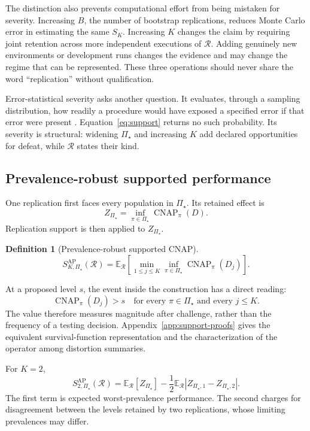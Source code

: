 \documentclass[11pt]{article}
\newcommand{\CNAP}{\operatorname{CNAP}}
\newcommand{\Regime}{\mathcal{R}}
\newcommand{\PSet}{\Pi_\star}
\newcommand{\E}{\mathbb{E}}
\newcommand{\SRob}{S_{K,\PSet}^{\mathrm{AP}}(\Regime)}
\newtheorem{definition}{Definition}
\theoremstyle{remark}
\begin{document}
The distinction also prevents computational effort from being mistaken for severity. Increasing $B$, the number of bootstrap replications, reduces Monte Carlo error in estimating the same $S_K$. Increasing $K$ changes the claim by requiring joint retention across more independent executions of $\Regime$. Adding genuinely new environments or development runs changes the evidence and may change the regime that can be represented. These three operations should never share the word ``replication'' without qualification.

Error-statistical severity asks another question. It evaluates, through a sampling distribution, how readily a procedure would have exposed a specified error if that error were present \cite{mayo1996error}. Equation~\eqref{eq:support} returns no such probability. Its severity is structural: widening $\PSet$ and increasing $K$ add declared opportunities for defeat, while $\Regime$ states their kind.

\subsection{Prevalence-robust supported performance}

One replication first faces every population in $\PSet$. Its retained effect is
\[
Z_{\PSet}
=
\inf_{\pi\in\PSet}\CNAP_\pi(D).
\]
Replication support is then applied to $Z_{\PSet}$.

\begin{definition}[Prevalence-robust supported CNAP]
\begin{equation}
\SRob
=
\E_{\Regime}
\left[
\min_{1\leq j\leq K}
\inf_{\pi\in\PSet}\CNAP_\pi(D_j)
\right].
\label{eq:robust-support}
\end{equation}
\end{definition}

At a proposed level $s$, the event inside the construction has a direct reading:
\[
\CNAP_\pi(D_j)>s
\quad
\text{for every }\pi\in\PSet
\text{ and every }j\leq K.
\]
The value therefore measures magnitude after challenge, rather than the frequency of a testing decision. Appendix~\ref{app:support-proofs} gives the equivalent survival-function representation and the characterization of the operator among distortion summaries.

For $K=2$,
\begin{equation}
S_{2,\PSet}^{\mathrm{AP}}(\Regime)
=
\E_{\Regime}[Z_{\PSet}]
-
\frac12\E_{\Regime}|Z_{\PSet,1}-Z_{\PSet,2}|.
\label{eq:robust-k2}
\end{equation}
The first term is expected worst-prevalence performance. The second charges for disagreement between the levels retained by two replications, whose limiting prevalences may differ.
\end{document}

